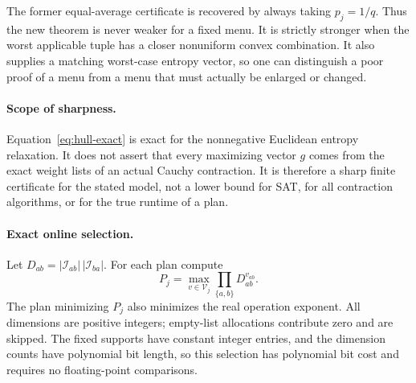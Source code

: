 The former equal-average certificate is recovered by always taking
$p_j=1/q$. Thus the new theorem is never weaker for a fixed menu. It is
strictly stronger when the worst applicable tuple has a closer nonuniform
convex combination. It also supplies a matching worst-case entropy vector,
so one can distinguish a poor proof of a menu from a menu that must actually
be enlarged or changed.

\paragraph{Scope of sharpness.}
Equation~\eqref{eq:hull-exact} is exact for the nonnegative Euclidean
entropy relaxation. It does not assert that every maximizing vector $g$
comes from the exact weight lists of an actual Cauchy contraction. It is
therefore a sharp finite certificate for the stated model, not a lower bound
for SAT, for all contraction algorithms, or for the true runtime of a plan.

\paragraph{Exact online selection.}
Let $D_{ab}=|\mathcal I_{ab}|\,|\mathcal I_{ba}|$. For each plan compute
\[
 P_j=\max_{v\in\mathcal V_j}\prod_{\{a,b\}}D_{ab}^{v_{ab}}.
\]
The plan minimizing $P_j$ also minimizes the real operation exponent.
All dimensions are positive integers; empty-list allocations contribute
zero and are skipped. The fixed supports have constant integer entries,
and the dimension counts have polynomial bit length, so this selection
has polynomial bit cost and requires no floating-point comparisons.
